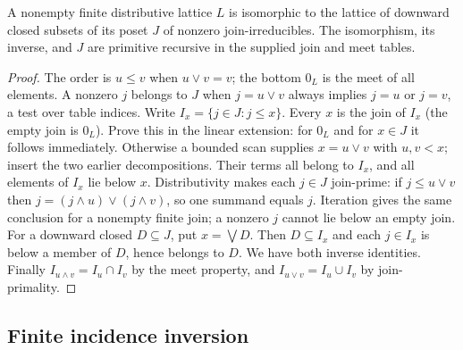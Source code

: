 \begin{theorem}\label{result38}
A nonempty finite distributive lattice \(L\) is isomorphic to the lattice
of downward closed subsets of its poset \(J\) of nonzero join-irreducibles.
The isomorphism, its inverse, and \(J\) are primitive recursive in the
supplied join and meet tables.
\end{theorem}
\begin{proof}
The order is \(u\le v\) when \(u\vee v=v\); the bottom \(0_L\)
is the meet of all elements. A nonzero \(j\) belongs to \(J\) when
\(j=u\vee v\) always implies \(j=u\) or \(j=v\), a test over table indices.
Write \(I_x=\{j\in J:j\le x\}\). Every \(x\) is the join of \(I_x\)
(the empty join is \(0_L\)). Prove this in the linear extension:
for \(0_L\) and for \(x\in J\) it follows immediately. Otherwise a bounded
scan supplies \(x=u\vee v\) with \(u,v<x\); insert the two earlier
decompositions. Their terms all belong to \(I_x\), and all elements of
\(I_x\) lie below \(x\).
Distributivity makes each \(j\in J\) join-prime: if \(j\le u\vee v\)
then \(j=(j\wedge u)\vee(j\wedge v)\), so one summand equals \(j\).
Iteration gives the same conclusion for a nonempty finite join; a
nonzero \(j\) cannot lie below an empty join. For a downward closed
\(D\subseteq J\), put \(x=\bigvee D\). Then \(D\subseteq I_x\) and
each \(j\in I_x\) is below a member of \(D\), hence belongs to \(D\).
We have both inverse identities. Finally \(I_{u\wedge v}=I_u\cap I_v\)
by the meet property, and \(I_{u\vee v}=I_u\cup I_v\) by join-primality.
\end{proof}

\subsection{Finite incidence inversion}

